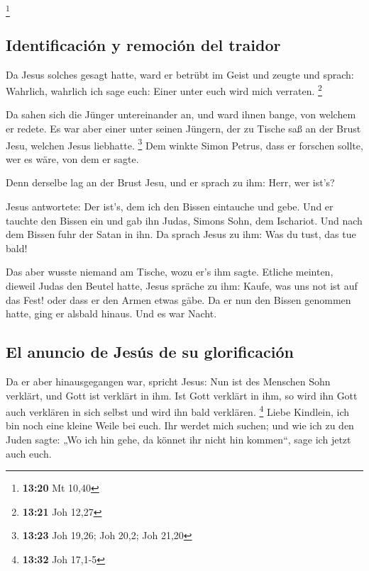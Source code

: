 \footnote{\textbf{13:20} Mt 10,40}

\hypertarget{identificaciuxf3n-y-remociuxf3n-del-traidor}{%
\subsection{Identificación y remoción del
traidor}\label{identificaciuxf3n-y-remociuxf3n-del-traidor}}

 Da Jesus solches gesagt hatte, ward er betrübt im Geist
und zeugte und sprach: Wahrlich, wahrlich ich sage euch: Einer unter
euch wird mich verraten. \footnote{\textbf{13:21} Joh 12,27}

 Da sahen sich die Jünger untereinander an, und ward
ihnen bange, von welchem er redete.  Es war aber einer
unter seinen Jüngern, der zu Tische saß an der Brust Jesu, welchen Jesus
liebhatte. \footnote{\textbf{13:23} Joh 19,26; Joh 20,2; Joh 21,20}
 Dem winkte Simon Petrus, dass er forschen sollte, wer es
wäre, von dem er sagte.

 Denn derselbe lag an der Brust Jesu, und er sprach zu
ihm: Herr, wer ist's?

 Jesus antwortete: Der ist's, dem ich den Bissen
eintauche und gebe. Und er tauchte den Bissen ein und gab ihn Judas,
Simons Sohn, dem Ischariot.  Und nach dem Bissen fuhr der
Satan in ihn. Da sprach Jesus zu ihm: Was du tust, das tue bald!

 Das aber wusste niemand am Tische, wozu er's ihm sagte.
 Etliche meinten, dieweil Judas den Beutel hatte, Jesus
spräche zu ihm: Kaufe, was uns not ist auf das Fest! oder dass er den
Armen etwas gäbe.  Da er nun den Bissen genommen hatte,
ging er alsbald hinaus. Und es war Nacht.

\hypertarget{el-anuncio-de-jesuxfas-de-su-glorificaciuxf3n}{%
\subsection{El anuncio de Jesús de su
glorificación}\label{el-anuncio-de-jesuxfas-de-su-glorificaciuxf3n}}

 Da er aber hinausgegangen war, spricht Jesus: Nun ist
des Menschen Sohn verklärt, und Gott ist verklärt in ihm.
 Ist Gott verklärt in ihm, so wird ihn Gott auch
verklären in sich selbst und wird ihn bald verklären. \footnote{\textbf{13:32}
  Joh 17,1-5}  Liebe Kindlein, ich bin noch eine kleine
Weile bei euch. Ihr werdet mich suchen; und wie ich zu den Juden sagte:
„Wo ich hin gehe, da könnet ihr nicht hin kommen``, sage ich jetzt auch
euch.

